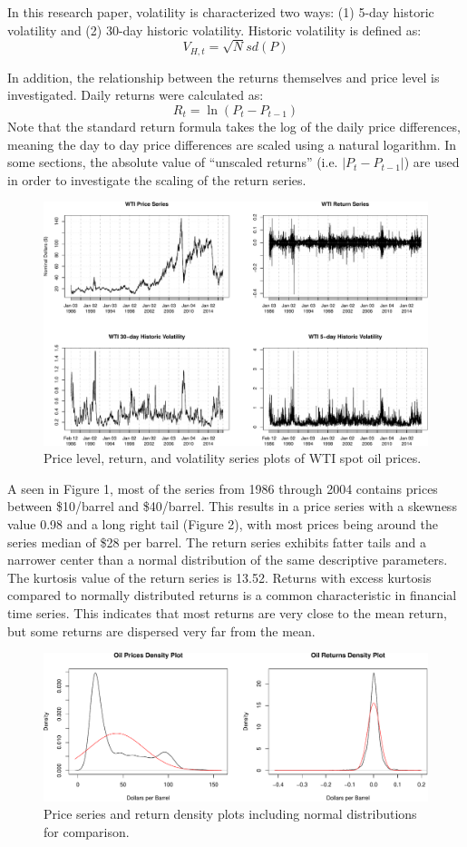 \documentclass[]{article}
\begin{document}
In this research paper, volatility is characterized two ways: (1) 5-day
historic volatility and (2) 30-day historic volatility. Historic
volatility is defined as: \[V_{H,t}=\sqrt{N}sd(P)\]

In addition, the relationship between the returns themselves and price
level is investigated. Daily returns were calculated as:
\[R_t = \ln({P_t-P_{t-1}})\] Note that the standard return formula takes
the log of the daily price differences, meaning the day to day price
differences are scaled using a natural logarithm. In some sections, the
absolute value of ``unscaled returns'' (i.e. \(|P_t-P_{t-1}|\)) are used
in order to investigate the scaling of the return series.

\begin{figure}[htbp]
\centering
\includegraphics{Figs/unnamed-chunk-4-1.pdf}
\caption{Price level, return, and volatility series plots of WTI spot
oil prices.}
\end{figure}

A seen in Figure 1, most of the series from 1986 through 2004 contains
prices between \$10/barrel and \$40/barrel. This results in a price
series with a skewness value 0.98 and a long right tail (Figure 2), with
most prices being around the series median of \$28 per barrel. The
return series exhibits fatter tails and a narrower center than a normal
distribution of the same descriptive parameters. The kurtosis value of
the return series is 13.52. Returns with excess kurtosis compared to
normally distributed returns is a common characteristic in financial
time series. This indicates that most returns are very close to the mean
return, but some returns are dispersed very far from the mean.

\begin{figure}[htbp]
\centering
\includegraphics{Figs/unnamed-chunk-5-1.pdf}
\caption{Price series and return density plots including normal
distributions for comparison.}
\end{figure}
\end{document}
